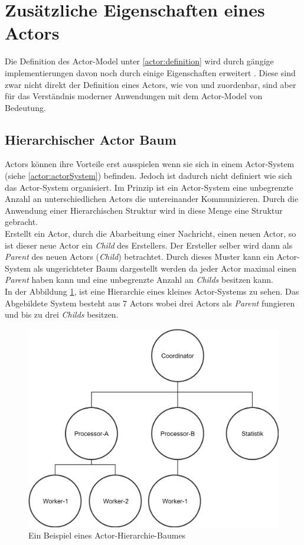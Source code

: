 \section{Zusätzliche Eigenschaften eines Actors}
Die Definition des Actor-Model unter \ref{actor:definition} wird durch gängige implementierungen davon noch durch einige Eigenschaften erweitert \citep{Vernon2015ReactiveAkka}. Diese sind zwar nicht direkt der Definition eines Actors, wie von \cite{Hewitt1973AIntelligence} und \cite{Agha1985ActorsSystems} zuordenbar, sind aber für das Verständnis moderner Anwendungen mit dem Actor-Model von Bedeutung.
\subsection{Hierarchischer Actor Baum}
Actors können ihre Vorteile erst ausspielen wenn sie sich in einem Actor-System (siehe \ref{actor:actorSystem}) befinden. Jedoch ist dadurch nicht definiert wie sich das Actor-System organisiert. Im Prinzip ist ein Actor-System eine unbegrenzte Anzahl an unterschiedlichen Actors die untereinander Kommunizieren. Durch die Anwendung einer Hierarchischen Struktur wird in diese Menge eine Struktur gebracht. \\
Erstellt ein Actor, durch die Abarbeitung einer Nachricht, einen neuen Actor, so ist dieser neue Actor ein \textit{Child} des Erstellers. Der Ersteller selber wird dann als \textit{Parent} des neuen Actors (\textit{Child}) betrachtet. Durch dieses Muster kann ein Actor-System als ungerichteter Baum dargestellt werden da jeder Actor maximal einen \textit{Parent} haben kann und eine unbegrenzte Anzahl an \textit{Childs} besitzen kann. \\
In der Abbildung \ref{fig:actor:actorHierarchySample}, ist eine Hierarchie eines kleines Actor-Systems zu sehen. Das Abgebildete System besteht aus 7 Actors wobei drei Actors als \textit{Parent} fungieren und bis zu drei \textit{Childs} besitzen. 
\begin{figure}
    \centering
    \includegraphics[width=0.6\linewidth]{gfx/actor/actorHierarchy}
    \caption{Ein Beispiel eines Actor-Hierarchie-Baumes}
    \label{fig:actor:actorHierarchySample}
\end{figure}

